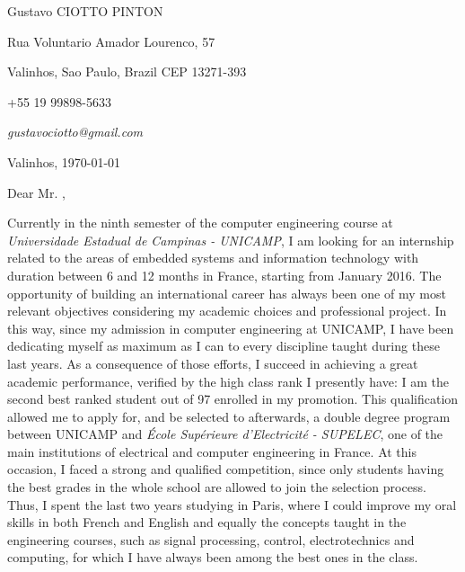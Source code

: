 \documentclass[12pt, a4paper]{article}
\begin{document}
\pagestyle{empty} 

Gustavo CIOTTO PINTON

Rua Voluntario Amador Lourenco, 57

Valinhos, Sao Paulo, Brazil CEP 13271-393

+55 19 99898-5633	

\textit{gustavociotto@gmail.com}
\begin{flushright}
Valinhos,  \today





\end{flushright}

Dear Mr. , 

\vspace{12pt}
Currently in the ninth semester of the computer engineering course at
\textit{Universidade Estadual de Campinas - UNICAMP}, I am looking for an
internship related to the areas of embedded systems and information technology
with duration between 6 and 12 months in France, starting from January 2016. The opportunity of
building an international career has always been one of my most relevant
objectives considering my academic choices and professional project. In this
way, since my admission in computer engineering at UNICAMP, I have been
dedicating myself as maximum as I can to every discipline taught during these
last years. As a consequence of those efforts, I succeed in achieving a great
academic performance, verified by the high class rank I presently have: I am the second
best ranked student out of 97 enrolled in my promotion. This qualification
allowed me to apply for, and be selected to afterwards, a double degree program
between UNICAMP and \textit{École Supérieure d'Electricité - SUPELEC}, one of
the main institutions of electrical and computer engineering in France. At this
occasion, I faced a strong and qualified competition, since only students
having the best grades in the whole school are allowed to join the selection
process. Thus, I spent the last two years studying in Paris, where I could
improve my oral skills in both French and English and equally the concepts
taught in the engineering courses, such as signal processing, control,
electrotechnics and computing, for which I have always been among the best ones
in the class.
\end{document}
